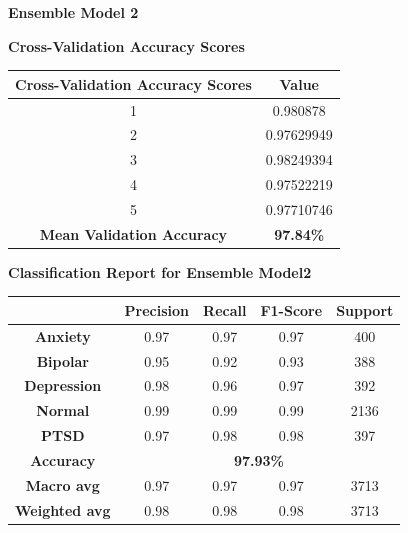 \pagebreak

\vspace{1em}
\noindent
\textbf{Ensemble Model 2}

\begin{center}
    \textbf{Cross-Validation Accuracy Scores} \\[0.5em]
    \begin{tabular}{|c|c|}
        \hline
        \textbf{Cross-Validation Accuracy Scores} & \textbf{Value} \\ \hline
        1 & 0.980878 \\ \hline
        2 & 0.97629949 \\ \hline
        3 & 0.98249394 \\ \hline
        4 & 0.97522219 \\ \hline
        5 & 0.97710746 \\ \hline
        \textbf{Mean Validation Accuracy} & \textbf{97.84\%} \\ \hline
    \end{tabular}
\end{center}


\begin{center}
    \textbf{Classification Report for Ensemble Model2} \\[0.5em]
    \begin{tabular}{|c|c|c|c|c|}
        \hline
        & \textbf{Precision} & \textbf{Recall} & \textbf{F1-Score} & \textbf{Support} \\ \hline
        \textbf{Anxiety}    & 0.97 & 0.97 & 0.97 & 400  \\ \hline
        \textbf{Bipolar}    & 0.95 & 0.92 & 0.93 & 388  \\ \hline
        \textbf{Depression} & 0.98 & 0.96 & 0.97 & 392  \\ \hline
        \textbf{Normal}     & 0.99 & 0.99 & 0.99 & 2136 \\ \hline
        \textbf{PTSD}       & 0.97 & 0.98 & 0.98 & 397  \\ \hline
        \textbf{Accuracy}   & \multicolumn{4}{|c|}{\textbf{97.93\%}} \\ \hline
        \textbf{Macro avg}  & 0.97 & 0.97 & 0.97 & 3713 \\ \hline
        \textbf{Weighted avg} & 0.98 & 0.98 & 0.98 & 3713 \\ \hline
    \end{tabular}
\end{center}

